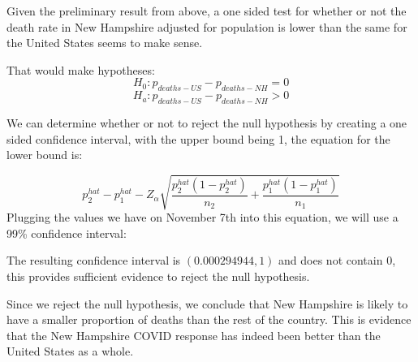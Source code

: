 \documentclass[
]{article}
\newenvironment{Shaded}{\begin{snugshade}}{\end{snugshade}}
\newcommand{\CommentTok}[1]{\textcolor[rgb]{0.56,0.35,0.01}{\textit{#1}}}
\newcommand{\DecValTok}[1]{\textcolor[rgb]{0.00,0.00,0.81}{#1}}
\newcommand{\FloatTok}[1]{\textcolor[rgb]{0.00,0.00,0.81}{#1}}
\newcommand{\KeywordTok}[1]{\textcolor[rgb]{0.13,0.29,0.53}{\textbf{#1}}}
\newcommand{\NormalTok}[1]{#1}
\newcommand{\OperatorTok}[1]{\textcolor[rgb]{0.81,0.36,0.00}{\textbf{#1}}}
\newcommand{\StringTok}[1]{\textcolor[rgb]{0.31,0.60,0.02}{#1}}
\begin{document}
Given the preliminary result from above, a one sided test for whether or
not the death rate in New Hampshire adjusted for population is lower
than the same for the United States seems to make sense.

That would make hypotheses: \[H_{0}: p_{deaths-US} - p_{deaths-NH} = 0\]
\[H_{a}: p_{deaths-US} - p_{deaths-NH} > 0\]

We can determine whether or not to reject the null hypothesis by
creating a one sided confidence interval, with the upper bound being 1,
the equation for the lower bound is:

\[p^{hat}_{2} - p^{hat}_{1} - Z_{\alpha}\sqrt{\frac{p^{hat}_{2}(1-p^{hat}_{2})}{n_{2}} + \frac{p^{hat}_{1}(1-p^{hat}_{1})}{n_{1}}}\]
Plugging the values we have on November 7th into this equation, we will
use a 99\% confidence interval:

\begin{Shaded}
\end{Shaded}

The resulting confidence interval is \((0.000294944, 1)\) and does not
contain 0, this provides sufficient evidence to reject the null
hypothesis.

Since we reject the null hypothesis, we conclude that New Hampshire is
likely to have a smaller proportion of deaths than the rest of the
country. This is evidence that the New Hampshire COVID response has
indeed been better than the United States as a whole.
\end{document}
